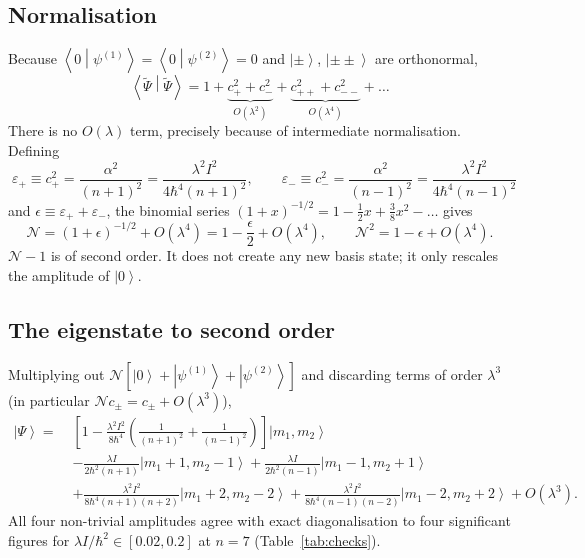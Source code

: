 \documentclass[preprint,12pt]{elsarticle}
\newcommand{\ket}[1]{\left|#1\right\rangle}
\newcommand{\braket}[2]{\left\langle#1\middle|#2\right\rangle}
\newcommand{\epsp}{\varepsilon_{+}}
\newcommand{\epsm}{\varepsilon_{-}}
\newcommand{\Norm}{\mathcal{N}}
\begin{document}
\subsection{Normalisation}

Because $\braket{0}{\psi^{(1)}}=\braket{0}{\psi^{(2)}}=0$ and $\ket{\pm}$,
$\ket{{\pm}{\pm}}$ are orthonormal,
\begin{equation}
\braket{\widetilde\Psi}{\widetilde\Psi}
=1+\underbrace{c_{+}^{2}+c_{-}^{2}}_{O(\lambda^{2})}
+\underbrace{c_{++}^{2}+c_{--}^{2}}_{O(\lambda^{4})}+\dots
\end{equation}
There is no $O(\lambda)$ term, precisely because of intermediate normalisation.
Defining
\begin{equation}
\boxed{\;\epsp\equiv c_{+}^{2}=\frac{\alpha^{2}}{(n+1)^{2}}
=\frac{\lambda^{2}I^{2}}{4\hbar^{4}(n+1)^{2}},\qquad
\epsm\equiv c_{-}^{2}=\frac{\alpha^{2}}{(n-1)^{2}}
=\frac{\lambda^{2}I^{2}}{4\hbar^{4}(n-1)^{2}}\;}
\label{eq:eps}
\end{equation}
and $\epsilon\equiv\epsp+\epsm$, the binomial series
$(1+x)^{-1/2}=1-\tfrac12x+\tfrac38x^{2}-\dots$ gives
\begin{equation}
\Norm=\left(1+\epsilon\right)^{-1/2}+O(\lambda^{4})
=1-\frac{\epsilon}{2}+O(\lambda^{4}),\qquad
\Norm^{2}=1-\epsilon+O(\lambda^{4}).
\label{eq:Nexp}
\end{equation}
$\Norm-1$ is of second order. It does not create any new basis state; it only
rescales the amplitude of $\ket0$.

\subsection{The eigenstate to second order}

Multiplying out $\Norm\left[\ket0+\ket{\psi^{(1)}}+\ket{\psi^{(2)}}\right]$ and
discarding terms of order $\lambda^{3}$ (in particular $\Norm c_{\pm}=c_{\pm}
+O(\lambda^{3})$),
\begin{align}
\ket{\Psi}=\;&\left[1-\frac{\lambda^{2}I^{2}}{8\hbar^{4}}
\left(\frac{1}{(n+1)^{2}}+\frac{1}{(n-1)^{2}}\right)\right]\ket{m_{1},m_{2}}
\nonumber\\
&-\frac{\lambda I}{2\hbar^{2}(n+1)}\ket{m_{1}+1,m_{2}-1}
+\frac{\lambda I}{2\hbar^{2}(n-1)}\ket{m_{1}-1,m_{2}+1}
\nonumber\\
&+\frac{\lambda^{2}I^{2}}{8\hbar^{4}(n+1)(n+2)}\ket{m_{1}+2,m_{2}-2}
+\frac{\lambda^{2}I^{2}}{8\hbar^{4}(n-1)(n-2)}\ket{m_{1}-2,m_{2}+2}
+O(\lambda^{3}).
\label{eq:state}
\end{align}
All four non-trivial amplitudes agree with exact diagonalisation to four
significant figures for $\lambda I/\hbar^{2}\in[0.02,0.2]$ at $n=7$
(Table~\ref{tab:checks}).
\end{document}
